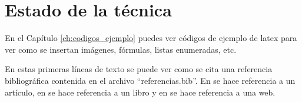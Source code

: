 \chapter{Estado de la técnica}
\label{ch:estado_de_la_tecnica}

En el Capítulo \ref{ch:codigos_ejemplo} puedes ver códigos de ejemplo de latex para ver como se insertan imágenes, fórmulas, listas enumeradas, etc.


En estas primeras líneas de texto se puede ver como se cita una referencia bibliográfica contenida en el archivo ``referencias.bib''. En \cite{ref_articulo} se hace referencia a un artículo, en \cite{ref_libro} se hace referencia a un libro y en \cite{ref_web} se hace referencia a una web. 

